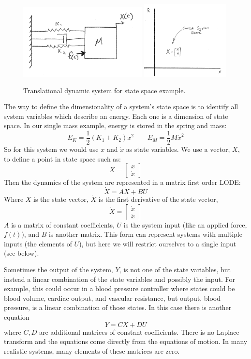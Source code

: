 \begin{figure}\centering
\includegraphics[width=65mm]{figs04/01069.png}   \hspace{0.25in}
\includegraphics[width=45mm]{figs04/01075.png}
\caption{Translational dynamic system for state space example.}\label{2Dstatespace}
\end{figure}

The way to define the dimensionality of a system's state space is to identify all system variables which describe an energy.  Each one is a dimension of state space.   In our single mass example, energy is stored in the spring and mass:
\[
E_K = \frac{1}{2}(K_1 + K_2)x^2 \qquad E_M = \frac{1}{2}M{\dot{x}}^2
\]
So for this system we would use $x$ and $\dot{x}$ as state variables.
We use a vector, $X$, to define a point in state space such as:
\[
X = \begin{bmatrix} x \\ \dot{x} \end{bmatrix}
\]
Then the dynamics of the system are represented in a matrix first order LODE:
\[
\dot{X} = AX+BU
\]
Where $X$ is the state vector, $\dot{X}$ is the first derivative of the state vector,
\[
\dot{X} = \begin{bmatrix}\dot{x} \\ \ddot{x} \end{bmatrix}
\]
$A$ is a matrix of constant coefficients,
$U$ is the system input (like an applied force, $f(t)$), and
$B$ is another matrix.  This form can represent systems with multiple inputs (the elements of $U$), but here we will restrict ourselves to a single input
(see below).

Sometimes the output of the system, $Y$, is not one of the state variables, but instead a linear
combination of the state variables and possibly the input. For example, this could occur in
a blood pressure controller where states could be
blood volume, cardiac output, and vascular resistance, but  output, blood pressure,
is a linear combination of those states.
In this case there is another equation
\[
Y = CX+DU
\]
where $C,D$ are additional matrices of constant coefficients.
There is no Laplace transform and the
equations come directly from the equations of motion. In many realistic systems,
many  elements of these matrices are zero.

